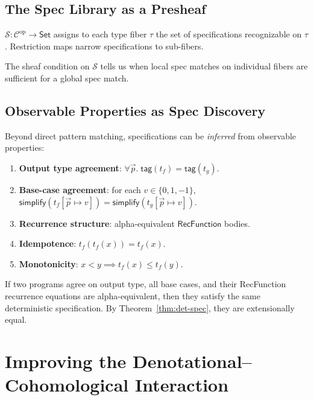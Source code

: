 \subsection{The Spec Library as a Presheaf}

\begin{definition}
$\mathcal{S} : \mathcal{C}^{\mathrm{op}} \to \mathsf{Set}$ assigns
to each type fiber $\tau$ the set of specifications recognizable
on $\tau$.  Restriction maps narrow specifications to sub-fibers.
\end{definition}

The sheaf condition on $\mathcal{S}$ tells us when local spec
matches on individual fibers are sufficient for a global spec
match.

\subsection{Observable Properties as Spec Discovery}

Beyond direct pattern matching, specifications can be
\emph{inferred} from observable properties:

\begin{enumerate}
  \item \textbf{Output type agreement}:
    $\forall \vec{p}.\; \mathsf{tag}(t_f) = \mathsf{tag}(t_g)$.
  \item \textbf{Base-case agreement}: for each $v \in \{0, 1, -1\}$,
    $\mathsf{simplify}(t_f[\vec{p} \mapsto v])
    = \mathsf{simplify}(t_g[\vec{p} \mapsto v])$.
  \item \textbf{Recurrence structure}: alpha-equivalent
    $\mathsf{RecFunction}$ bodies.
  \item \textbf{Idempotence}: $t_f(t_f(x)) = t_f(x)$.
  \item \textbf{Monotonicity}: $x < y \implies t_f(x) \leq t_f(y)$.
\end{enumerate}

\begin{theorem}
\label{thm:obs-spec}
If two programs agree on output type, all base cases, and their
RecFunction recurrence equations are alpha-equivalent, then they
satisfy the same deterministic specification.  By
Theorem~\ref{thm:det-spec}, they are extensionally equal.
\end{theorem}


\section{Improving the Denotational--Cohomological Interaction}
\label{sec:denot-cohom-interaction}

